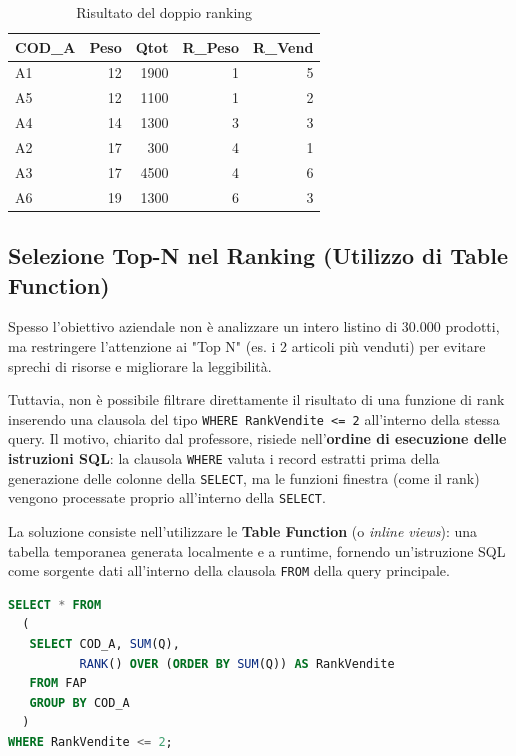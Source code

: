 \begin{table}[H]
\centering
\caption{Risultato del doppio ranking}
\begin{tabular}{lrrrr}
\toprule
\textbf{COD\_A} & \textbf{Peso} & \textbf{Qtot} & \textbf{R\_Peso} & \textbf{R\_Vend} \\
\midrule
A1 & 12 & 1900 & 1 & 5 \\
A5 & 12 & 1100 & 1 & 2 \\
A4 & 14 & 1300 & 3 & 3 \\
A2 & 17 & 300  & 4 & 1 \\
A3 & 17 & 4500 & 4 & 6 \\
A6 & 19 & 1300 & 6 & 3 \\
\bottomrule
\end{tabular}
\end{table}

\subsection{Selezione Top-N nel Ranking (Utilizzo di Table Function)}

Spesso l'obiettivo aziendale non è analizzare un intero listino di 30.000 prodotti, ma restringere l'attenzione ai "Top N" (es. i 2 articoli più venduti) per evitare sprechi di risorse e migliorare la leggibilità.

Tuttavia, non è possibile filtrare direttamente il risultato di una funzione di rank inserendo una clausola del tipo \texttt{WHERE RankVendite <= 2} all'interno della stessa query. Il motivo, chiarito dal professore, risiede nell'\textbf{ordine di esecuzione delle istruzioni SQL}: la clausola \texttt{WHERE} valuta i record estratti prima della generazione delle colonne della \texttt{SELECT}, ma le funzioni finestra (come il rank) vengono processate proprio all'interno della \texttt{SELECT}.

La soluzione consiste nell'utilizzare le \textbf{Table Function} (o \textit{inline views}): una tabella temporanea generata localmente e a runtime, fornendo un'istruzione SQL come sorgente dati all'interno della clausola \texttt{FROM} della query principale.

\begin{lstlisting}[language=SQL, basicstyle=\small\ttfamily, keywordstyle=\bfseries\color{blue}, frame=single]
SELECT * FROM
  (
   SELECT COD_A, SUM(Q),
          RANK() OVER (ORDER BY SUM(Q)) AS RankVendite
   FROM FAP
   GROUP BY COD_A
  )
WHERE RankVendite <= 2;
\end{lstlisting}

